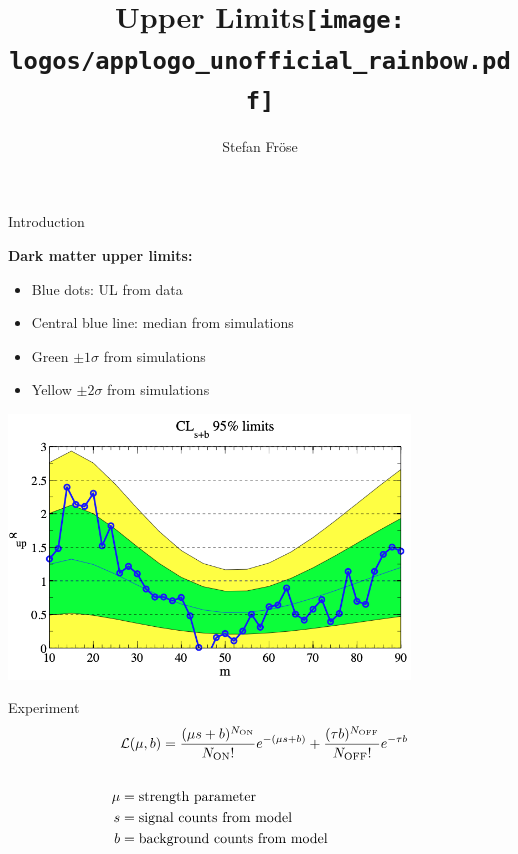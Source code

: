 \documentclass[aspectratio=1610, 9pt]{beamer}
\title{Upper Limits\texttt{[image: logos/applogo\_unofficial\_rainbow.pdf]}}
\author[S.~Fröse]{Stefan Fröse}
\begin{document}
\maketitle

\begin{frame}{Introduction}
    \begin{minipage}{0.49\textwidth}
        \Large
        \textbf{Dark matter upper limits:}
        \begin{itemize}
            \item Blue dots: UL from data
            \item Central blue line: median from simulations
            \item Green $\pm 1\sigma$ from simulations
            \item Yellow $\pm 2\sigma$ from simulations
        \end{itemize}
    \end{minipage}
    \hfill
    \begin{minipage}{0.5\textwidth}
        \includegraphics[width=0.8\textwidth]{imgs/CL up.png}
    \end{minipage}
\end{frame}



\begin{frame}{Experiment}
    \centering
    \Large
    \begin{align}
        &\mathcal{L}(\mu,b) = \frac{(\mu s + b)^{N_\text{ON}}}{N_\text{ON}!} e^{-(\mu s + b)} + \frac{(\tau b)^{N_\text{OFF}}}{N_\text{OFF}!} e^{-\tau b} \notag \\[4ex]
        \mu &= \text{strength parameter} \notag \\
        s &= \text{signal counts from model} \notag \\
        b &= \text{background counts from model}\notag 
    \end{align}
\end{frame}
\end{document}
